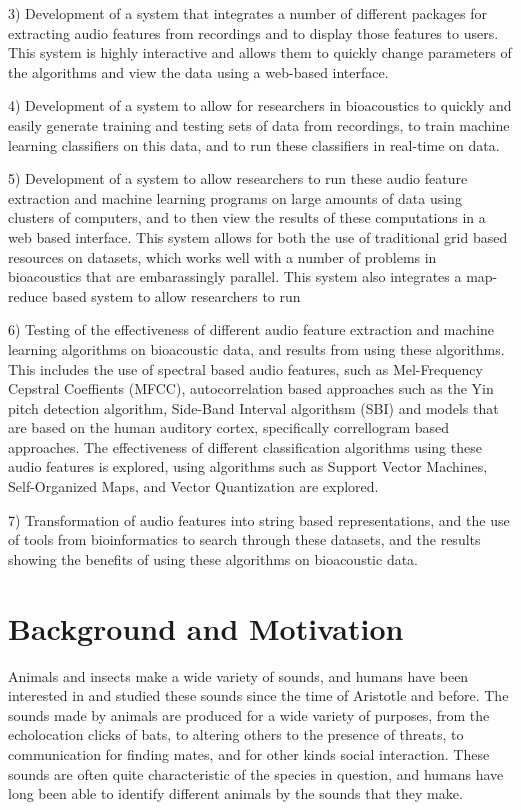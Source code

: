 \documentclass[12pt,oneside]{book}
\begin{document}
3) Development of a system that integrates a number of different
packages for extracting audio features from recordings and to display
those features to users.  This system is highly interactive and allows
them to quickly change parameters of the algorithms and view the data
using a web-based interface.

4) Development of a system to allow for researchers in bioacoustics to
quickly and easily generate training and testing sets of data from
recordings, to train machine learning classifiers on this data, and to
run these classifiers in real-time on data.

5) Development of a system to allow researchers to run these audio
feature extraction and machine learning programs on large amounts of
data using clusters of computers, and to then view the results of
these computations in a web based interface.  This system allows for
both the use of traditional grid based resources on datasets, which
works well with a number of problems in bioacoustics that are
embarassingly parallel.  This system also integrates a map-reduce
based system to allow researchers to run

6) Testing of the effectiveness of different audio feature extraction
and machine learning algorithms on bioacoustic data, and results from
using these algorithms.  This includes the use of spectral based audio
features, such as Mel-Frequency Cepstral Coeffients (MFCC),
autocorrelation based approaches such as the Yin pitch detection
algorithm, Side-Band Interval algorithsm (SBI) and models that are
based on the human auditory cortex, specifically correllogram based
approaches.  The effectiveness of different classification algorithms
using these audio features is explored, using algorithms such as
Support Vector Machines, Self-Organized Maps, and Vector Quantization
are explored.

7) Transformation of audio features into string based representations,
and the use of tools from bioinformatics to search through these
datasets, and the results showing the benefits of using these
algorithms on bioacoustic data.


\section{Background and Motivation}
\label{section:introduction:BackgroundAndMotivation}

Animals and insects make a wide variety of sounds, and humans have
been interested in and studied these sounds since the time of
Aristotle \cite{aristotle} and before.  The sounds made by animals are
produced for a wide variety of purposes, from the echolocation clicks
of bats, to altering others to the presence of threats, to
communication for finding mates, and for other kinds social
interaction.  These sounds are often quite characteristic of the
species in question, and humans have long been able to identify
different animals by the sounds that they make.  
\end{document}
